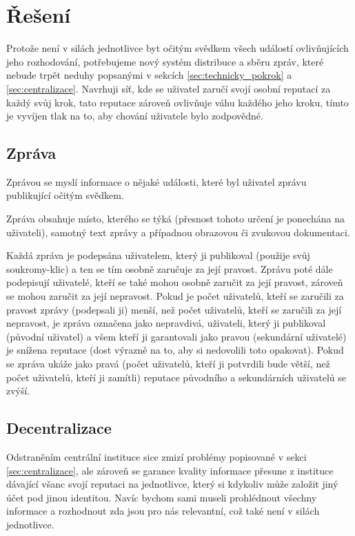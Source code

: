 \documentclass{report}
\begin{document}
\chapter{Řešení}
\label{ch:reseni}

Protože není v silách jednotlivce byt očitým svědkem všech událostí ovlivňujících jeho rozhodování, potřebujeme nový systém distribuce a sběru zpráv, které nebude trpět neduhy popsanými v sekcích \ref{sec:technicky_pokrok} a \ref{sec:centralizace}. Navrhuji síť, kde se uživatel zaručí svojí osobní reputací za každý svůj krok, tato reputace zároveň ovlivňuje váhu každého jeho kroku, tímto je vyvíjen tlak na to, aby chování uživatele bylo zodpovědné.

\section{Zpráva}
\label{sec:zprava}

Zprávou se myslí informace o nějaké události, které byl uživatel zprávu publikující očitým svědkem.

Zpráva obsahuje místo, kterého se týká (přesnost tohoto určení je ponechána na uživateli), samotný text zprávy a případnou obrazovou či zvukovou dokumentaci.

Každá zpráva je podepsána uživatelem, který ji publikoval (použije svůj \gls{soukromy-klic}) a ten se tím osobně zaručuje za její pravost. Zprávu poté dále podepisují uživatelé, kteří se také mohou osobně zaručit za její pravost, zároveň se mohou zaručit za její nepravost. Pokud je počet uživatelů, kteří se zaručili za pravost zprávy (podepsali ji) menší, než počet uživatelů, kteří se zaručili za její nepravost, je zpráva označena jako nepravdivá, uživateli, který ji publikoval (původní uživatel) a všem kteří ji garantovali jako pravou (sekundární uživatelé) je snížena reputace (dost výrazně na to, aby si nedovolili toto opakovat). Pokud se zpráva ukáže jako pravá (počet uživatelů, kteří ji potvrdili bude větší, než počet uživatelů, kteří ji zamítli) reputace původního a sekundárních uživatelů se zvýší.

\section{Decentralizace}
\label{sec:decentralizace}
Odstraněním centrální instituce sice zmizí problémy popisované v sekci \ref{sec:centralizace}, ale zároveň se garance kvality informace přesune z instituce dávající všanc svojí reputaci na jednotlivce, který si kdykoliv může založit jiný účet pod jinou identitou. Navíc bychom sami museli prohlédnout všechny informace a rozhodnout zda jsou pro nás relevantní, což také není v silách jednotlivce. \citep{netanel01}
\end{document}
